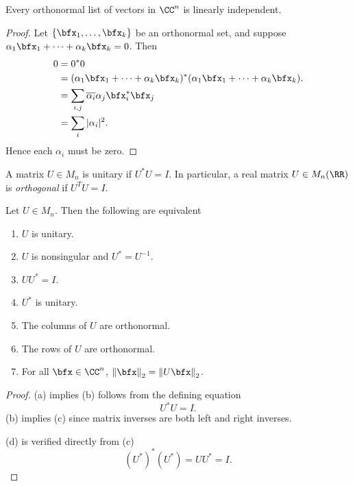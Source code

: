\documentclass{article}
\newcommand{\norm}[1]{\ensuremath{\left\lVert{#1}\right\rVert}}
\begin{document}
\begin{theorem}
    Every orthonormal list of vectors in $\CC^n$ is linearly independent.
\end{theorem}

\begin{proof}
    Let $\{\bfx_1,\ldots,\bfx_k\}$ be an orthonormal set, and suppose $\alpha_1\bfx_1 + \cdots + \alpha_k\bfx_k = 0$.
    Then
    \begin{align*}
        0
        &=
        0^\ast0
        \\
        &=
        (\alpha_1\bfx_1 + \cdots + \alpha_k\bfx_k)^\ast(\alpha_1\bfx_1 + \cdots + \alpha_k\bfx_k).
        \\
        &=
        \sum_{i,j}
        \overline{\alpha_i} \alpha_j \bfx_i^\ast \bfx_j
        \\
        &=
        \sum_i
        |\alpha_i|^2.
    \end{align*}
    Hence each $\alpha_i$ must be zero.
\end{proof}

\begin{definition}
    A matrix $U \in M_n$ is unitary if $U^\ast U = I$.
    In particular, a real matrix $U \in M_n(\RR)$ is \textit{orthogonal} if $U^TU = I$.
\end{definition}

\begin{theorem}
    Let $U \in M_n$.
    Then the following are equivalent
    \begin{enumerate}[label=(\alph*)]
        \item $U$ is unitary.
        \item $U$ is nonsingular and $U^\ast = U^{-1}$.
        \item $UU^\ast = I$.
        \item $U^\ast$ is unitary.
        \item The columns of $U$ are orthonormal.
        \item The rows of $U$ are orthonormal.
        \item For all $\bfx \in \CC^n$, $\norm{\bfx}_2 = \norm{U\bfx}_2$.
    \end{enumerate}
\end{theorem}

\begin{proof}
    (a) implies (b) follows from the defining equation
    \[
        U^\ast U = I.
    \]
    (b) implies (c) since matrix inverses are both left and right inverses.

    (d) is verified directly from (c)
    \[
        (U^\ast)^\ast (U^\ast) = UU^\ast = I.
    \]
\end{proof}
\end{document}
